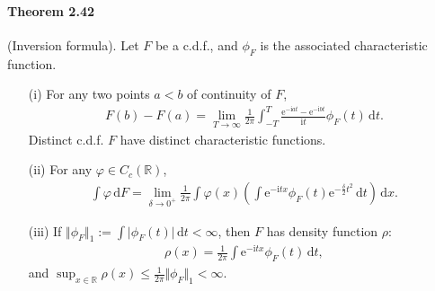 \documentclass{article}
\numberwithin{equation}{section}
\newcommand{\e}{\mathrm{e}}
\renewcommand{\d}{\mathrm{d}}
\renewcommand{\i}{\mathrm{i}}
\theoremstyle{plain}
\theoremstyle{definition}
\begin{document}
\paragraph{Theorem 2.42\label{thm:2.42}} (Inversion formula). Let $F$ be a c.d.f., and $\phi_F$ is the associated characteristic function.
\begin{itemize}
\item[(i)] For any two points $a<b$ of continuity of $F$,
\begin{align*}
	F(b)-F(a) = \lim_{T\to\infty}\frac{1}{2\pi}\int_{-T}^T\frac{\e^{-\i at}-\e^{-\i bt}}{\i t}\phi_F(t)\,\d t.
\end{align*}
Distinct c.d.f. $F$ have distinct characteristic functions.
\item[(ii)] For any $\varphi\in C_c(\mathbb{R})$, 
\begin{align*}
	\int\varphi\,\d F = \lim_{\delta\to 0^+}\frac{1}{2\pi} \int\varphi(x)\left(\int \e^{-\i tx}\phi_F(t)\e^{-\frac{\delta}{2}t^2}\,\d t\right)\,\d x.
\end{align*}
\item[(iii)] If $\Vert\phi_F\Vert_1:= \int\vert\phi_F(t)\vert\,\d t<\infty$, then $F$ has density function $\rho$:
\begin{align*}
	\rho(x)=\frac{1}{2\pi}\int\e^{-\i tx}\phi_F(t)\,\d t,
\end{align*}
and $\sup_{x\in\mathbb{R}}\rho(x)\leq\frac{1}{2\pi}\Vert\phi_F\Vert_1 < \infty$.
\end{itemize}
\end{document}
